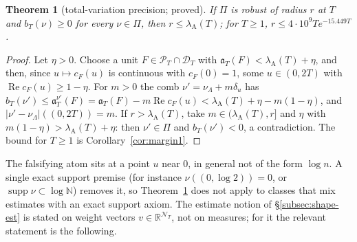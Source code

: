 \documentclass[11pt]{amsart}
\newtheorem{theorem}{Theorem}[section]
\theoremstyle{definition}
\theoremstyle{remark}
\newcommand{\R}{\mathbb R}
\newcommand{\N}{\mathbb N}
\newcommand{\Rel}{\operatorname{Re}}
\newcommand{\PT}{\mathcal P_T}
\newcommand{\lamA}{\lambda_{\mathrm A}(T)}
\newcommand{\NT}{\mathcal N_T}
\begin{document}
\begin{theorem}[total-variation precision; proved]\label{thm:geo-tv}
If $\Pi$ is robust of radius $r$ at $T$ and $b_T(\nu)\ge0$ for every $\nu\in\Pi$, then $r\le\lamA$; for $T\ge1$, $r\le4\cdot10^9Te^{-15.449T}$.
\end{theorem}
\begin{proof}
Let $\eta>0$. Choose a unit $F\in\PT\cap\mathcal D_T$ with $\mathfrak a_T(F)<\lamA+\eta$, and then, since $u\mapsto c_F(u)$ is continuous with
$c_F(0)=1$, some $u\in(0,2T)$ with $\Rel c_F(u)\ge1-\eta$. For $m>0$ the comb $\nu'=\nu_\Lambda+m\delta_u$ has
$b_T(\nu')\le\mathfrak a^{\nu'}_T(F)=\mathfrak a_T(F)-m\Rel c_F(u)<\lamA+\eta-m(1-\eta)$, and $|\nu'-\nu_\Lambda|((0,2T))=m$. If $r>\lamA$, take
$m\in(\lamA,r]$ and $\eta$ with $m(1-\eta)>\lamA+\eta$: then $\nu'\in\Pi$ and $b_T(\nu')<0$, a contradiction. The bound for $T\ge1$ is
Corollary~\ref{cor:margin1}.
\end{proof}

The falsifying atom sits at a point $u$ near $0$, in general not of the form $\log n$. A single exact support premise (for instance
$\nu((0,\log2))=0$, or $\operatorname{supp}\nu\subset\log\N$) removes it, so Theorem~\ref{thm:geo-tv} does not apply to classes that mix
estimates with an exact support axiom. The estimate notion of \S\ref{subsec:shape-est} is stated on weight vectors $v\in\R^{\NT}$,
not on measures; for it the relevant statement is the following.
\end{document}
